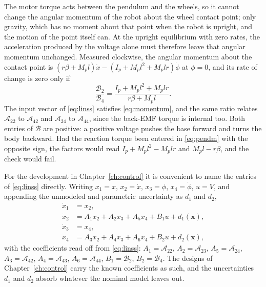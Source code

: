 \begin{remark}\label{rem:momentum}
The motor torque acts between the pendulum and the wheels, so it cannot change
the angular momentum of the robot about the wheel contact point; only gravity,
which has no moment about that point when the robot is upright, and the motion
of the point itself can. At the upright equilibrium with zero rates, the
acceleration produced by the voltage alone must therefore leave that angular
momentum unchanged. Measured clockwise, the angular momentum about the contact
point is $(r\beta+M_pl)\dot x-(I_p+M_pl^2+M_plr)\dot\phi$ at $\phi=0$, and its
rate of change is zero only if
\begin{equation}\label{eq:momentum}
\frac{\mathcal{B}_2}{\mathcal{B}_4}=\frac{I_p+M_pl^2+M_plr}{r\beta+M_pl} .
\end{equation}
The input vector of \eqref{eq:linss} satisfies \eqref{eq:momentum}, and the same
ratio relates $\mathcal{A}_{22}$ to $\mathcal{A}_{42}$ and $\mathcal{A}_{24}$ to
$\mathcal{A}_{44}$, since the back-EMF torque is internal too. Both entries of
$\mathcal{B}$ are positive: a positive voltage pushes the base forward and turns
the body backward. Had the reaction torque been entered in \eqref{eq:pendm} with
the opposite sign, the factors would read $I_p+M_pl^2-M_plr$ and $M_pl-r\beta$,
and the check would fail.
\end{remark}

For the development in Chapter~\ref{ch:control} it is convenient to name the
entries of \eqref{eq:linss} directly. Writing $x_1=x$, $x_2=\dot x$, $x_3=\phi$,
$x_4=\dot\phi$, $u=V$, and appending the unmodeled and parametric uncertainty as
$d_1$ and $d_2$,
\begin{equation}\label{eq:plantform}
\begin{aligned}
\dot x_1&=x_2,\\
\dot x_2&=A_1x_2+A_2x_3+A_5x_4+B_1u+d_1(\mathbf{x}),\\
\dot x_3&=x_4,\\
\dot x_4&=A_3x_2+A_4x_3+A_6x_4+B_2u+d_2(\mathbf{x}),
\end{aligned}
\end{equation}
with the coefficients read off from \eqref{eq:linss}: $A_1=\mathcal{A}_{22}$,
$A_2=\mathcal{A}_{23}$, $A_5=\mathcal{A}_{24}$, $A_3=\mathcal{A}_{42}$,
$A_4=\mathcal{A}_{43}$, $A_6=\mathcal{A}_{44}$, $B_1=\mathcal{B}_2$,
$B_2=\mathcal{B}_4$. The designs of Chapter~\ref{ch:control} carry the known
coefficients as such, and the uncertainties $d_1$ and $d_2$ absorb whatever the
nominal model leaves out.

